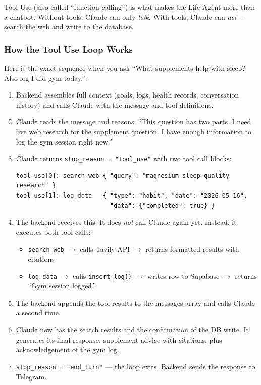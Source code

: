 \documentclass[12pt, a4paper]{article}
\begin{document}
Tool Use (also called ``function calling'') is what makes the Life Agent more than a chatbot. Without tools, Claude can only \textit{talk}. With tools, Claude can \textit{act} --- search the web and write to the database.

\subsubsection{How the Tool Use Loop Works}

Here is the exact sequence when you ask ``What supplements help with sleep? Also log I did gym today.'':

\begin{enumerate}
    \item Backend assembles full context (goals, logs, health records, conversation history) and calls Claude with the message and tool definitions.

    \item Claude reads the message and reasons: ``This question has two parts. I need live web research for the supplement question. I have enough information to log the gym session right now.''

    \item Claude returns \texttt{stop\_reason = "tool\_use"} with two tool call blocks:
    \begin{lstlisting}
tool_use[0]: search_web { "query": "magnesium sleep quality research" }
tool_use[1]: log_data   { "type": "habit", "date": "2026-05-16",
                          "data": {"completed": true} }
    \end{lstlisting}

    \item The backend receives this. It does \textit{not} call Claude again yet. Instead, it executes both tool calls:
    \begin{itemize}[noitemsep]
        \item \texttt{search\_web} $\rightarrow$ calls Tavily API $\rightarrow$ returns formatted results with citations
        \item \texttt{log\_data} $\rightarrow$ calls \texttt{insert\_log()} $\rightarrow$ writes row to Supabase $\rightarrow$ returns ``Gym session logged.''
    \end{itemize}

    \item The backend appends the tool results to the messages array and calls Claude a second time.

    \item Claude now has the search results and the confirmation of the DB write. It generates its final response: supplement advice with citations, plus acknowledgement of the gym log.

    \item \texttt{stop\_reason = "end\_turn"} --- the loop exits. Backend sends the response to Telegram.
\end{enumerate}
\end{document}
